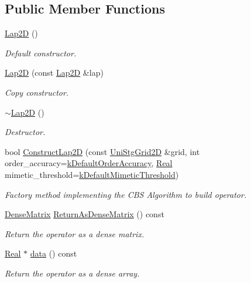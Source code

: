 \subsection*{Public Member Functions}
\begin{DoxyCompactItemize}
\item 
\hyperlink{classmtk_1_1Lap2D_ada4370fb8d7726e70a3257e3841c6d1f}{Lap2\+D} ()
\begin{DoxyCompactList}\small\item\em Default constructor. \end{DoxyCompactList}\item 
\hyperlink{classmtk_1_1Lap2D_acf62bf6a1c041e4b02f06346054d7af2}{Lap2\+D} (const \hyperlink{classmtk_1_1Lap2D}{Lap2\+D} \&lap)
\begin{DoxyCompactList}\small\item\em Copy constructor. \end{DoxyCompactList}\item 
\hyperlink{classmtk_1_1Lap2D_a8ca8447a4da7a5ddcf826486992374a5}{$\sim$\+Lap2\+D} ()
\begin{DoxyCompactList}\small\item\em Destructor. \end{DoxyCompactList}\item 
bool \hyperlink{classmtk_1_1Lap2D_a188ee8fee643463affca7de2884711b1}{Construct\+Lap2\+D} (const \hyperlink{classmtk_1_1UniStgGrid2D}{Uni\+Stg\+Grid2\+D} \&grid, int order\+\_\+accuracy=\hyperlink{group__c01-roots_ga0d95560098eb36420511103637b6952f}{k\+Default\+Order\+Accuracy}, \hyperlink{group__c01-roots_gac080bbbf5cbb5502c9f00405f894857d}{Real} mimetic\+\_\+threshold=\hyperlink{group__c01-roots_ga35718d949bdc81a08a9cc8ebbe3478a2}{k\+Default\+Mimetic\+Threshold})
\begin{DoxyCompactList}\small\item\em Factory method implementing the C\+B\+S Algorithm to build operator. \end{DoxyCompactList}\item 
\hyperlink{classmtk_1_1DenseMatrix}{Dense\+Matrix} \hyperlink{classmtk_1_1Lap2D_aaac0a22eaa2f036869b24fd420ce5761}{Return\+As\+Dense\+Matrix} () const 
\begin{DoxyCompactList}\small\item\em Return the operator as a dense matrix. \end{DoxyCompactList}\item 
\hyperlink{group__c01-roots_gac080bbbf5cbb5502c9f00405f894857d}{Real} $\ast$ \hyperlink{classmtk_1_1Lap2D_a102427355df09c2aad400c6ce18e5636}{data} () const 
\begin{DoxyCompactList}\small\item\em Return the operator as a dense array. \end{DoxyCompactList}\end{DoxyCompactItemize}
